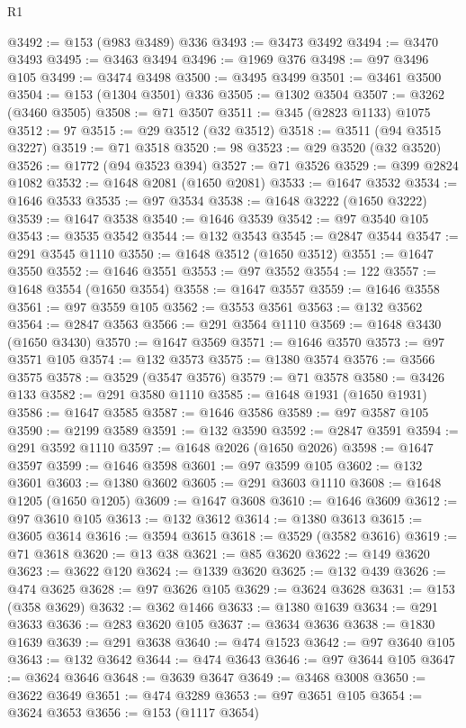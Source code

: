 \begin{lexlean}{R1}
\begin{coremodule}
@3492 := @153 (@983 @3489) @336
@3493 := @3473 @3492
@3494 := @3470 @3493
@3495 := @3463 @3494
@3496 := @1969 @376
@3498 := @97 @3496 @105
@3499 := @3474 @3498
@3500 := @3495 @3499
@3501 := @3461 @3500
@3504 := @153 (@1304 @3501) @336
@3505 := @1302 @3504
@3507 := @3262 (@3460 @3505)
@3508 := @71 @3507
@3511 := @345 (@2823 @1133) @1075
@3512 := 97
@3515 := @29 @3512 (@32 @3512)
@3518 := @3511 (@94 @3515 @3227)
@3519 := @71 @3518
@3520 := 98
@3523 := @29 @3520 (@32 @3520)
@3526 := @1772 (@94 @3523 @394)
@3527 := @71 @3526
@3529 := @399 @2824 @1082
@3532 := @1648 @2081 (@1650 @2081)
@3533 := @1647 @3532
@3534 := @1646 @3533
@3535 := @97 @3534
@3538 := @1648 @3222 (@1650 @3222)
@3539 := @1647 @3538
@3540 := @1646 @3539
@3542 := @97 @3540 @105
@3543 := @3535 @3542
@3544 := @132 @3543
@3545 := @2847 @3544
@3547 := @291 @3545 @1110
@3550 := @1648 @3512 (@1650 @3512)
@3551 := @1647 @3550
@3552 := @1646 @3551
@3553 := @97 @3552
@3554 := 122
@3557 := @1648 @3554 (@1650 @3554)
@3558 := @1647 @3557
@3559 := @1646 @3558
@3561 := @97 @3559 @105
@3562 := @3553 @3561
@3563 := @132 @3562
@3564 := @2847 @3563
@3566 := @291 @3564 @1110
@3569 := @1648 @3430 (@1650 @3430)
@3570 := @1647 @3569
@3571 := @1646 @3570
@3573 := @97 @3571 @105
@3574 := @132 @3573
@3575 := @1380 @3574
@3576 := @3566 @3575
@3578 := @3529 (@3547 @3576)
@3579 := @71 @3578
@3580 := @3426 @133
@3582 := @291 @3580 @1110
@3585 := @1648 @1931 (@1650 @1931)
@3586 := @1647 @3585
@3587 := @1646 @3586
@3589 := @97 @3587 @105
@3590 := @2199 @3589
@3591 := @132 @3590
@3592 := @2847 @3591
@3594 := @291 @3592 @1110
@3597 := @1648 @2026 (@1650 @2026)
@3598 := @1647 @3597
@3599 := @1646 @3598
@3601 := @97 @3599 @105
@3602 := @132 @3601
@3603 := @1380 @3602
@3605 := @291 @3603 @1110
@3608 := @1648 @1205 (@1650 @1205)
@3609 := @1647 @3608
@3610 := @1646 @3609
@3612 := @97 @3610 @105
@3613 := @132 @3612
@3614 := @1380 @3613
@3615 := @3605 @3614
@3616 := @3594 @3615
@3618 := @3529 (@3582 @3616)
@3619 := @71 @3618
@3620 := @13 @38
@3621 := @85 @3620
@3622 := @149 @3620
@3623 := @3622 @120
@3624 := @1339 @3620
@3625 := @132 @439
@3626 := @474 @3625
@3628 := @97 @3626 @105
@3629 := @3624 @3628
@3631 := @153 (@358 @3629)
@3632 := @362 @1466
@3633 := @1380 @1639
@3634 := @291 @3633
@3636 := @283 @3620 @105
@3637 := @3634 @3636
@3638 := @1830 @1639
@3639 := @291 @3638
@3640 := @474 @1523
@3642 := @97 @3640 @105
@3643 := @132 @3642
@3644 := @474 @3643
@3646 := @97 @3644 @105
@3647 := @3624 @3646
@3648 := @3639 @3647
@3649 := @3468 @3008
@3650 := @3622 @3649
@3651 := @474 @3289
@3653 := @97 @3651 @105
@3654 := @3624 @3653
@3656 := @153 (@1117 @3654)

\end{coremodule}
\end{lexlean}
